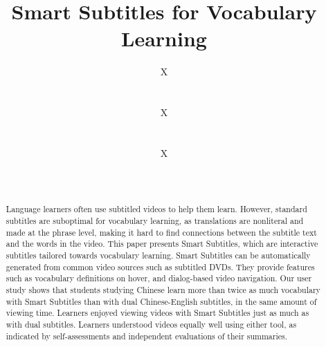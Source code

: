 \documentclass{sigchi}
\begin{document}
\title{Smart Subtitles for Vocabulary Learning}

\author{
  \alignauthor X\\
    \\
    \\
  \alignauthor X \\
    \\
    \\
  \alignauthor X\\
    \\
    \\
}

\maketitle

\begin{abstract}
Language learners often use subtitled videos to help
them learn. However, standard subtitles
are suboptimal for vocabulary learning, as
translations are nonliteral and made at the phrase
level, making it hard to find connections between the
subtitle text and the words in the video. This paper
presents Smart Subtitles, which are interactive subtitles
tailored towards vocabulary learning.
Smart Subtitles can be automatically generated from common video sources
such as subtitled DVDs.
They provide features such as vocabulary definitions on hover, and
dialog-based video navigation. Our user study shows
that students studying Chinese learn more than twice as much
vocabulary with Smart Subtitles than with dual
Chinese-English subtitles, in the same amount of viewing time.
Learners enjoyed viewing videos
with Smart Subtitles just as much as with dual subtitles.
Learners understood videos equally well using either tool,
as indicated by self-assessments
and independent evaluations of their summaries.
\end{abstract}


\end{document}
